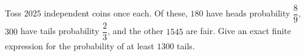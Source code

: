 Toss $2025$ independent coins once each. Of these, $180$ have heads probability $\dfrac{8}{9}$, $300$ have tails probability $\dfrac{2}{3}$, and the other $1545$ are fair. Give an exact finite expression for the probability of at least $1300$ tails.
